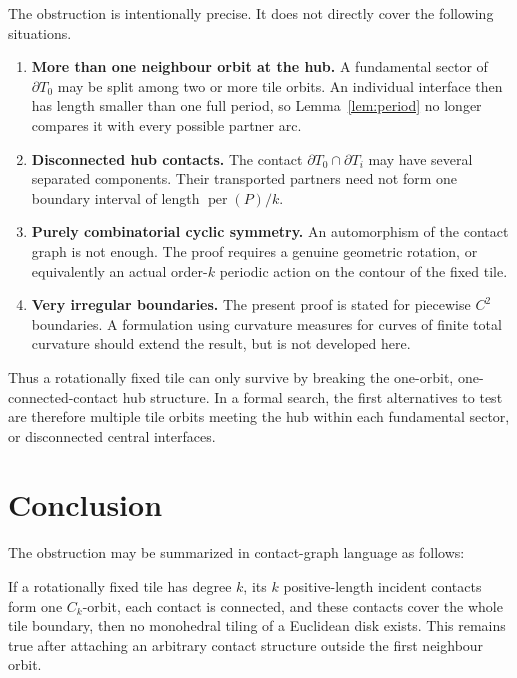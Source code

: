 \documentclass[11pt]{article}
\theoremstyle{definition}
\theoremstyle{remark}
\newcommand{\T}{T}
\begin{document}
The obstruction is intentionally precise.  It does not directly cover the following situations.

\begin{enumerate}[leftmargin=8mm]
\item \textbf{More than one neighbour orbit at the hub.}  A fundamental sector of $\partial\T_0$ may be split among two or more tile orbits.  An individual interface then has length smaller than one full period, so Lemma~\ref{lem:period} no longer compares it with every possible partner arc.

\item \textbf{Disconnected hub contacts.}  The contact $\partial\T_0\cap\partial\T_i$ may have several separated components.  Their transported partners need not form one boundary interval of length $\operatorname{per}(P)/k$.

\item \textbf{Purely combinatorial cyclic symmetry.}  An automorphism of the contact graph is not enough.  The proof requires a genuine geometric rotation, or equivalently an actual order-$k$ periodic action on the contour of the fixed tile.

\item \textbf{Very irregular boundaries.}  The present proof is stated for piecewise $C^2$ boundaries.  A formulation using curvature measures for curves of finite total curvature should extend the result, but is not developed here.
\end{enumerate}

Thus a rotationally fixed tile can only survive by breaking the one-orbit, one-connected-contact hub structure.  In a formal search, the first alternatives to test are therefore multiple tile orbits meeting the hub within each fundamental sector, or disconnected central interfaces.

\section*{Conclusion}

The obstruction may be summarized in contact-graph language as follows:

\begin{plainbox}[boxblue]
If a rotationally fixed tile has degree $k$, its $k$ positive-length incident contacts form one $C_k$-orbit, each contact is connected, and these contacts cover the whole tile boundary, then no monohedral tiling of a Euclidean disk exists.  This remains true after attaching an arbitrary contact structure outside the first neighbour orbit.
\end{plainbox}
\end{document}
